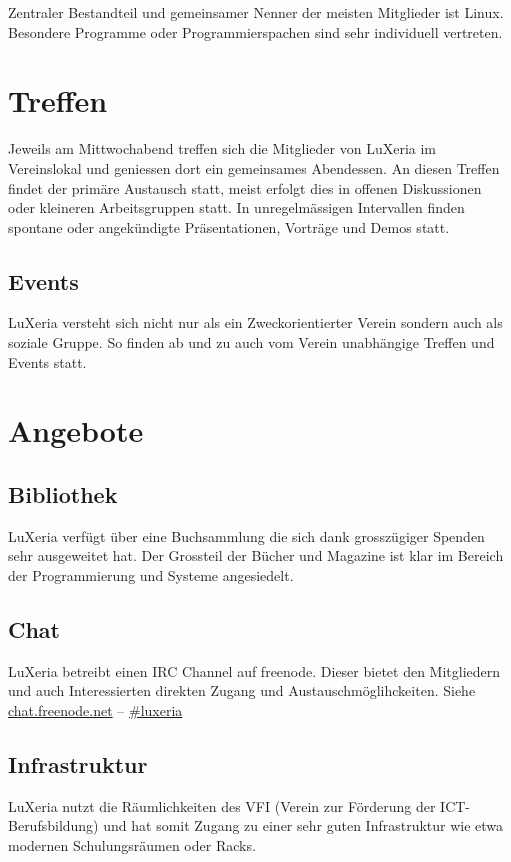 \documentclass[10pt,foldmark,notumble]{leaflet}
\begin{document}
Zentraler Bestandteil und gemeinsamer Nenner der meisten 
Mitglieder ist Linux. Besondere Programme oder Programmierspachen 
sind sehr individuell vertreten.

\section{Treffen}
Jeweils am Mittwochabend treffen sich die Mitglieder von LuXeria 
im Vereinslokal und geniessen dort ein gemeinsames Abendessen.
An diesen Treffen findet der primäre Austausch statt, meist 
erfolgt dies in offenen Diskussionen oder kleineren Arbeitsgruppen
statt. In unregelmässigen Intervallen finden spontane oder
angekündigte Präsentationen, Vorträge und Demos statt.

\subsection{Events}
LuXeria versteht sich nicht nur als ein Zweckorientierter 
Verein sondern auch als soziale Gruppe. So finden ab und
zu auch vom Verein unabhängige Treffen und Events statt.

\section{Angebote}
\subsection{Bibliothek}
LuXeria verfügt über eine Buchsammlung die sich dank 
grosszügiger Spenden sehr ausgeweitet hat.
Der Grossteil der Bücher und Magazine ist klar im
Bereich der Programmierung und Systeme angesiedelt.

\subsection{Chat}
LuXeria betreibt einen IRC Channel auf freenode. Dieser
bietet den Mitgliedern und auch Interessierten direkten
Zugang und Austauschmöglihckeiten. Siehe
\url{chat.freenode.net} -- \url{#luxeria}

\subsection{Infrastruktur}
LuXeria nutzt die Räumlichkeiten des VFI (Verein zur 
Förderung der ICT-Berufsbildung) und hat somit Zugang 
zu einer sehr guten Infrastruktur wie etwa modernen
Schulungsräumen oder Racks.
\end{document}
